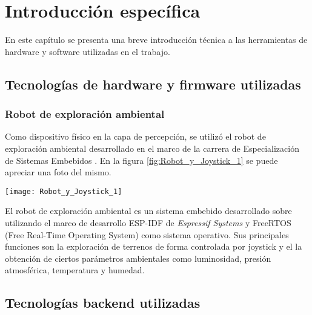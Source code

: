 \chapter{Introducción específica} %

\label{Chapter2}



En este capítulo se presenta una breve introducción técnica a las herramientas de hardware y software utilizadas en el trabajo.

\section{Tecnologías de hardware y firmware utilizadas}


\subsection{Robot de exploración ambiental}

Como dispositivo físico en la capa de percepción, se utilizó el robot de exploración ambiental desarrollado en el marco de la carrera de Especialización de Sistemas Embebidos \citep{cese_gonzalo_memoria}. En la figura \ref{fig:Robot_y_Joystick_1} se puede apreciar una foto del mismo.


\begin{center}
   \texttt{[image: Robot\_y\_Joystick\_1]}
   \label{fig:Robot_y_Joystick_1}
\end{center}

El robot de exploración ambiental es un sistema embebido desarrollado sobre \cite{ESP32} utilizando el marco de desarrollo ESP-IDF \cite{ESPIDF_home} de \textit{Espressif Systems} y FreeRTOS (Free Real-Time Operating System) \citep{FreeRTOS} como sistema operativo. Sus principales funciones son la exploración de terrenos de forma controlada por joystick y el la obtención de ciertos parámetros ambientales como luminosidad, presión atmosférica, temperatura y humedad.



\section{Tecnologías backend utilizadas}


